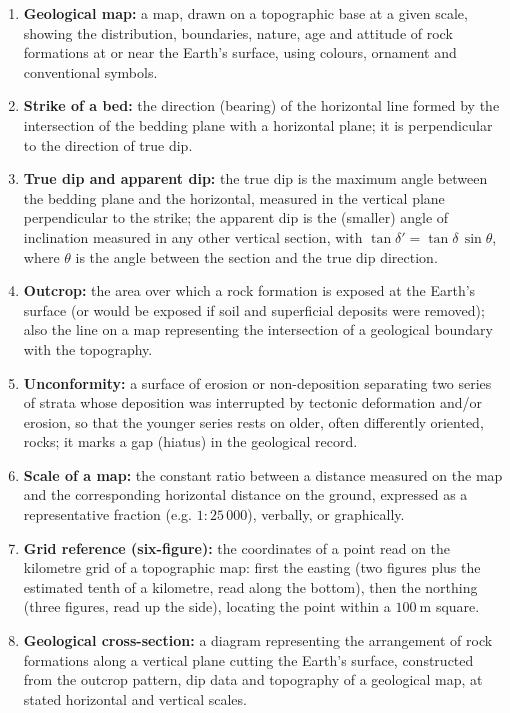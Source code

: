 \documentclass[11pt]{article}
\newcommand{\cle}[1]{{\popxbold\color{popdark}#1}}
\begin{document}
\begin{corrige}
\begin{enumerate}
\item \textbf{\cle{Geological map}:} a map, drawn on a topographic base at a given scale, showing the distribution, boundaries, nature, age and attitude of rock formations at or near the Earth's surface, using colours, ornament and conventional symbols.
\item \textbf{\cle{Strike of a bed}:} the direction (bearing) of the horizontal line formed by the intersection of the bedding plane with a horizontal plane; it is perpendicular to the direction of true dip.
\item \textbf{\cle{True dip} and \cle{apparent dip}:} the true dip is the maximum angle between the bedding plane and the horizontal, measured in the vertical plane perpendicular to the strike; the apparent dip is the (smaller) angle of inclination measured in any other vertical section, with $\tan\delta' = \tan\delta\,\sin\theta$, where $\theta$ is the angle between the section and the true dip direction.
\item \textbf{\cle{Outcrop}:} the area over which a rock formation is exposed at the Earth's surface (or would be exposed if soil and superficial deposits were removed); also the line on a map representing the intersection of a geological boundary with the topography.
\item \textbf{\cle{Unconformity}:} a surface of erosion or non-deposition separating two series of strata whose deposition was interrupted by tectonic deformation and/or erosion, so that the younger series rests on older, often differently oriented, rocks; it marks a gap (hiatus) in the geological record.
\item \textbf{\cle{Scale of a map}:} the constant ratio between a distance measured on the map and the corresponding horizontal distance on the ground, expressed as a representative fraction (e.g. $1:25\,000$), verbally, or graphically.
\item \textbf{\cle{Grid reference (six-figure)}:} the coordinates of a point read on the kilometre grid of a topographic map: first the easting (two figures plus the estimated tenth of a kilometre, read along the bottom), then the northing (three figures, read up the side), locating the point within a $100\ \mathrm{m}$ square.
\item \textbf{\cle{Geological cross-section}:} a diagram representing the arrangement of rock formations along a vertical plane cutting the Earth's surface, constructed from the outcrop pattern, dip data and topography of a geological map, at stated horizontal and vertical scales.
\end{enumerate}
\end{corrige}
\end{document}
